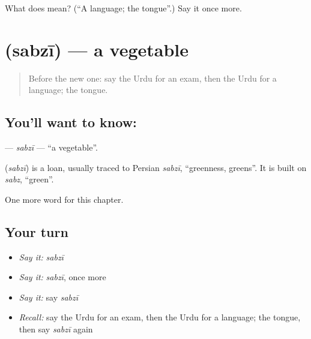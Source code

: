 \begin{tcolorbox}[breakable,colback=teal!4,colframe=teal!35!black,title={Before you move on}]
What does  mean? (\textquotedblleft{}A language; the tongue\textquotedblright{}.) Say it once more.
\end{tcolorbox}
\section[\texorpdfstring{\ur{سبزی} (sabzī)}{سبزی (sabzī)}]{ (sabzī) — a vegetable}

\label{lesson:UR-C114-sabzi}



\begin{quote}
Before the new one: say the Urdu for an exam, then the Urdu for a language; the tongue.
\end{quote}

\subsection*{You'll want to know: }
\textbf{} — \emph{sabzī} — \textquotedblleft{}a vegetable\textquotedblright{}.

\begin{cousinweb}
\textbf{} (\emph{sabzī}) is a loan, usually traced to Persian \emph{sabzī}, \textquotedblleft{}greenness, greens\textquotedblright{}. It is built on \emph{sabz}, \textquotedblleft{}green\textquotedblright{}.
\end{cousinweb}

\begin{grammarlens}[title={What you've built}]
One more word for this chapter.
\end{grammarlens}

\subsection*{Your turn}
\begin{itemize}
\raggedright
  \item \emph{Say it:} \emph{sabzī}
  \item \emph{Say it:} \emph{sabzī}, once more
  \item \emph{Say it:} say \emph{sabzī}
  \item \emph{Recall:} say the Urdu for an exam, then the Urdu for a language; the tongue, then say \emph{sabzī} again
\end{itemize}

